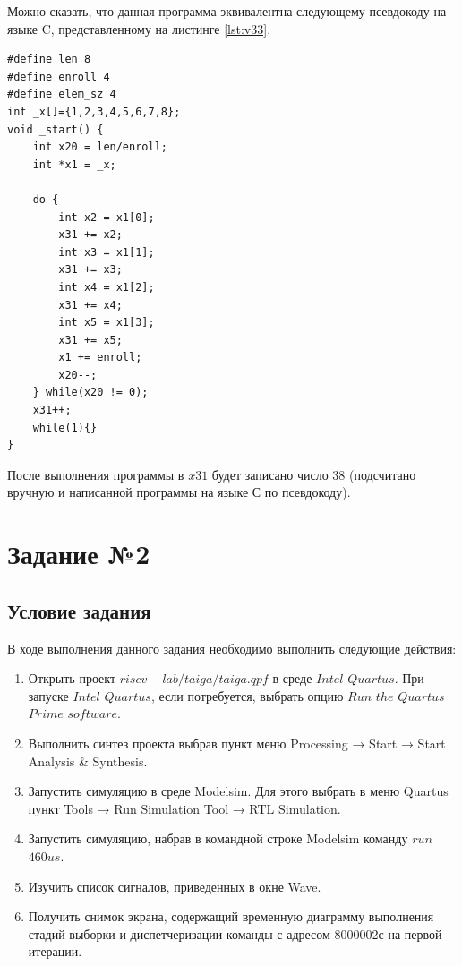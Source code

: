 \clearpage
Можно сказать, что данная программа эквивалентна следующему псевдокоду на языке C, представленному на листинге \ref{lst:v33}.

\begin{lstlisting}[label=lst:v33,caption=Псевдокод программы]
#define len 8
#define enroll 4
#define elem_sz 4
int _x[]={1,2,3,4,5,6,7,8};
void _start() {
	int x20 = len/enroll;
	int *x1 = _x;
	
	do {
		int x2 = x1[0];
		x31 += x2;
		int x3 = x1[1];
		x31 += x3;
		int x4 = x1[2];
		x31 += x4;
		int x5 = x1[3];
		x31 += x5;
		x1 += enroll;
		x20--;
	} while(x20 != 0);
	x31++;
	while(1){}
}
\end{lstlisting}

После выполнения программы в $x31$ будет записано \newline число 38 (подсчитано вручную и написанной программы на языке С по псевдокоду).

\clearpage

\section{Задание №2}

\subsection*{Условие задания}
В ходе выполнения данного задания необходимо выполнить следующие действия:
\begin{enumerate}
	\item Открыть проект $riscv-lab/taiga/taiga.qpf$ в среде $Intel$ $Quartus$. При запуске $Intel$ $Quartus$, если потребуется, выбрать опцию $Run$ $the$ $Quartus$ $Prime$ $software$.
	\item Выполнить синтез проекта выбрав пункт меню Processing → Start → Start Analysis \& Synthesis.
	\item Запустить симуляцию в среде Modelsim. Для этого выбрать в меню Quartus пункт Tools → Run Simulation Tool → RTL Simulation.
	\item Запустить симуляцию, набрав в командной строке Modelsim команду $run$ $460us$.
	\item Изучить список сигналов, приведенных в окне Wave.
	\item Получить снимок экрана, содержащий временную диаграмму выполнения стадий выборки и диспетчеризации команды с адресом 8000002с на первой итерации.
\end{enumerate}

